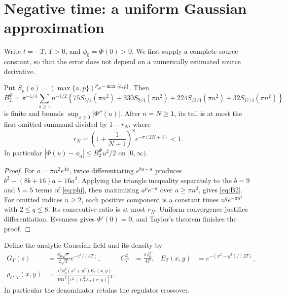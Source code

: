 \section{Negative time: a uniform Gaussian approximation}\label{sec:negative}
Write $t=-T$, $T>0$, and $\phi_0=\Phi(0)>0$.
We first supply a complete-source constant, so that the error does
not depend on a numerically estimated source derivative.

\begin{lemma}\label{lem:B2}
Put $S_p(a)=(\max\{a,p\})^pe^{-\max\{a,p\}}$. Then
\begin{equation}
 B_2^{\Phi}=\pi^{-1/4}\sum_{n\ge1}n^{-1/2}
 \left\{75S_{5/4}(\pi n^2)+330S_{9/4}(\pi n^2)
       +224S_{13/4}(\pi n^2)+32S_{17/4}(\pi n^2)\right\}
 \label{eq:B2}
\end{equation}
is finite and bounds $\sup_{u\ge0}|\Phi''(u)|$.
After $n=N\ge1$, its tail is at most the first omitted summand
divided by $1-r_N$, where
\[
 r_N=\left(1+\frac1{N+1}\right)^8e^{-\pi(2N+3)}<1.
\]
In particular $|\Phi(u)-\phi_0|\le B_2^{\Phi}u^2/2$ on $[0,\infty)$.
\end{lemma}
\begin{proof}
For $a=\pi n^2e^{4u}$, twice differentiating $e^{bu-a}$ produces
$b^2-(8b+16)a+16a^2$. Applying the triangle inequality separately to
the $b=9$ and $b=5$ terms of \eqref{eq:phi}, then maximizing
$a^pe^{-a}$ over $a\ge\pi n^2$, gives \eqref{eq:B2}.
For omitted indices $n\ge2$, each positive component is a constant
times $n^qe^{-\pi n^2}$ with $2\le q\le8$.
Its consecutive ratio is at most $r_N$.
Uniform convergence justifies differentiation.
Evenness gives $\Phi'(0)=0$, and Taylor's theorem finishes the proof.
\end{proof}

Define the analytic Gaussian field and its density by
\begin{align}
 G_T(z)&=\frac{\phi_0\sqrt\pi}{2\sqrt T}e^{-z^2/(4T)},&
 C_T^2&=\frac{\pi\phi_0^2}{4T},&
 E_T(x,y)&=e^{-(x^2-y^2)/(2T)}, \label{eq:Gaussian}\\
 \rho_{G,T}(x,y)&=
 \frac{\epsilon^2\phi_0^2(x^2+y^2)E_T(x,y)}
 {16T^3[\epsilon^2+C_T^2E_T(x,y)]^2}.
 \label{eq:Gaussiandensity}
\end{align}
In particular the denominator retains the regulator crossover.

